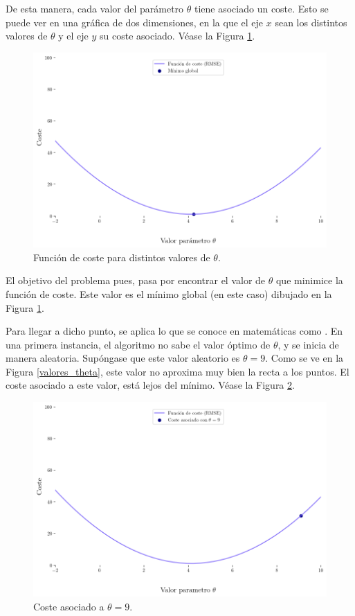 De esta manera, cada valor del parámetro $\theta$ tiene asociado un coste. Esto se puede ver en una gráfica de dos dimensiones, en la que el eje $x$ sean los distintos valores de $\theta$ y el eje $y$ su coste asociado. Véase la Figura \ref{func_coste}.
\begin{figure}[H]
    \centering
    \includegraphics[scale = 0.35]{imgs/func_coste.png}
    \caption{Función de coste para distintos valores de $\theta$.}
    \label{func_coste}
\end{figure}
El objetivo del problema pues, pasa por encontrar el valor de $\theta$ que minimice la función de coste. Este valor es el mínimo global (en este caso) dibujado en la Figura \ref{func_coste}.

Para llegar a dicho punto, se aplica lo que se conoce en matemáticas como . En una primera instancia, el algoritmo no sabe el valor óptimo de $\theta$, y se inicia de manera aleatoria. Supóngase que este valor aleatorio es $\theta = 9$. Como se ve en la Figura \ref{valores_theta}, este valor no aproxima muy bien la recta a los puntos. El coste asociado a este valor, está lejos del mínimo. Véase la Figura \ref{valor9}.

\begin{figure}[H]
    \centering
    \includegraphics[scale = 0.35]{imgs/valor9.png}
    \caption{Coste asociado a $\theta = 9$.}
    \label{valor9}
\end{figure}


